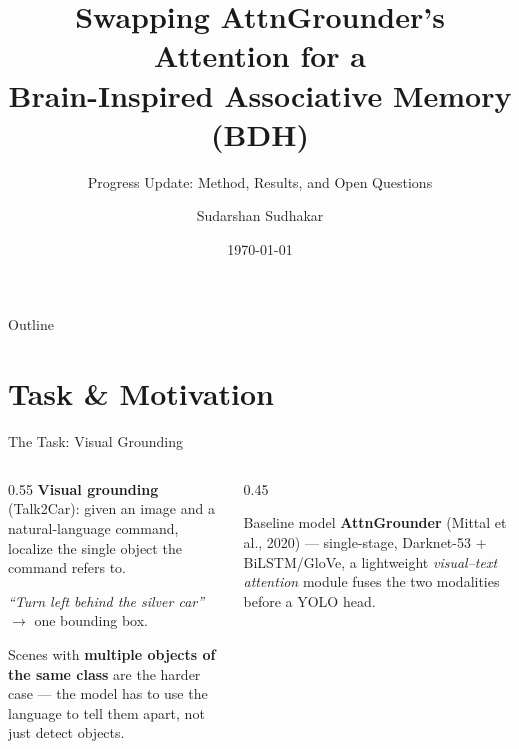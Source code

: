 \documentclass[aspectratio=169]{beamer}
\title[BDH-Swapped AttnGrounder]{Swapping AttnGrounder's Attention for a\\ Brain-Inspired Associative Memory (BDH)}
\subtitle{Progress Update: Method, Results, and Open Questions}
\author{Sudarshan Sudhakar}
\date{\today}
\begin{document}
\begin{frame}
  \titlepage
\end{frame}

\begin{frame}{Outline}
  \tableofcontents
\end{frame}

\section{Task \& Motivation}

\begin{frame}{The Task: Visual Grounding}
  \begin{columns}[T]
    \begin{column}{0.55\textwidth}
      \textbf{Visual grounding} (Talk2Car): given an image and a
      natural-language command, localize the single object the
      command refers to.
      \vspace{0.4cm}

      \textit{``Turn left behind the silver car''} $\rightarrow$
      one bounding box.

      \vspace{0.4cm}
      Scenes with \textbf{multiple objects of the same class} are the
      harder case — the model has to use the language to tell them
      apart, not just detect objects.
    \end{column}
    \begin{column}{0.45\textwidth}
      \begin{block}{Baseline model}
        \textbf{AttnGrounder} (Mittal et al., 2020) — single-stage,
        Darknet-53 + BiLSTM/GloVe, a lightweight \emph{visual--text
        attention} module fuses the two modalities before a YOLO head.
      \end{block}
    \end{column}
  \end{columns}
\end{frame}
\end{document}
